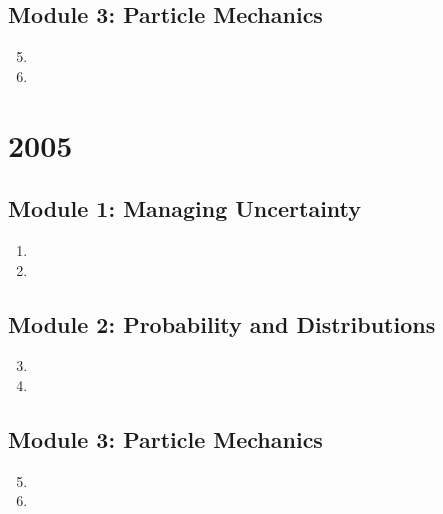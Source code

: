 \documentclass[fleqn,titlepage]{book}
\numberwithin{equation}{section}
\theoremstyle{plain}
\theoremstyle{definition}
\theoremstyle{remark}
\begin{document}
\section{Module 3: Particle Mechanics}
\begin{enumerate}[label=\bfseries  \arabic*.]\setcounter{enumi}{4}
\item %
\item %
\end{enumerate}

\chapter{2005}
\section{Module 1: Managing Uncertainty}
\begin{enumerate}[label=\bfseries  \arabic*.]\setcounter{enumi}{0}
\item 
\item 
\end{enumerate}
\section{Module 2: Probability and Distributions}
\begin{enumerate}[label=\bfseries  \arabic*.]\setcounter{enumi}{2}
\item 
\item 
\end{enumerate}
\section{Module 3: Particle Mechanics}
\begin{enumerate}[label=\bfseries  \arabic*.]\setcounter{enumi}{4}
\item 
\item 
\end{enumerate}

\end{document}
